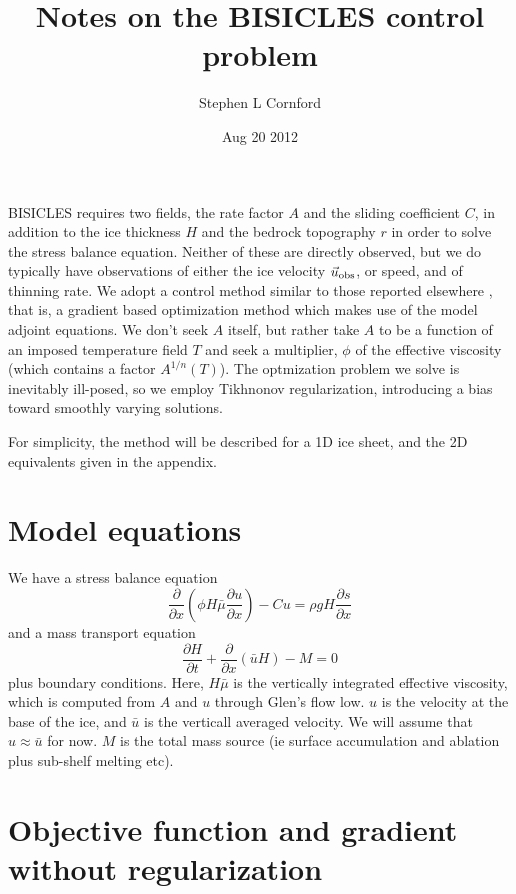 \documentclass{article}
\title{Notes on the BISICLES control problem}
\author{Stephen L Cornford}
\date{Aug 20 2012}
\begin{document}
\maketitle
\onehalfspacing
BISICLES requires two fields, the rate factor $A$ and the sliding
coefficient $C$, in addition to the ice thickness $H$ and the
bedrock topography $r$ in order to solve the stress balance equation.
Neither of these are directly observed, but we do typically have 
observations of either the ice velocity $\vec{u}_{\rm obs}$, or speed, and of thinning rate. 
We adopt a  control method similar to those reported elsewhere
\cite{JTBB09:doi:10.3189/002214309788608705,JoSH10:doi:10.1029/2010GL044819,Maca93,MRSL10:doi:10.1029/2010GL043853},
that is, a gradient based optimization method which makes use of the model adjoint equations.
We don't seek $A$ itself, but rather take $A$ to be a function of an imposed temperature field $T$ and seek
a multiplier, $\phi$ of the effective viscosity (which contains a factor $A^{1/n}(T)$). The optmization
problem we solve is inevitably ill-posed, so we employ Tikhnonov regularization, introducing
a bias toward smoothly varying solutions.
 
For simplicity, the method will be described for a 1D ice sheet, and the 2D equivalents given in the
appendix.

\section{Model equations}


We have a stress balance equation
\begin{equation}
\label{eq::sb}
\frac{\partial}{\partial x} \left ( \phi H \bar{\mu}  \frac{\partial u}{\partial x} \right ) - Cu = \rho g H \frac{\partial s}{\partial x} 
\end{equation}
and a mass transport equation
\begin{equation}
\frac{\partial H }{\partial t} + \frac{\partial}{\partial x} \left (\bar{u} H \right ) - M = 0
\end{equation}
plus boundary conditions. Here, $H \bar{\mu}$ is the vertically integrated effective viscosity, which is computed from $A$ and
$u$ through Glen's flow low. $u$ is the velocity 
at the base of the ice, and $\bar{u}$ is the verticall averaged velocity. We will assume that $u \approx \bar{u}$ for now. $M$
is the total mass source (ie surface accumulation and ablation plus sub-shelf melting etc).

\section{Objective function and gradient without regularization}
\end{document}
